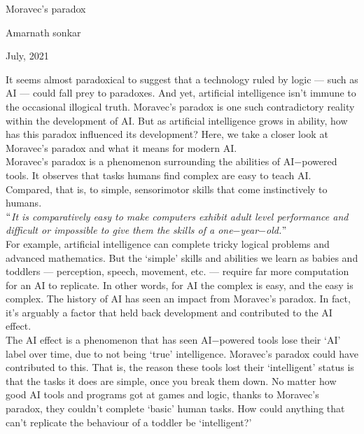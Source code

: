 \documentclass[12pt]{article}
\begin{document}
\begin{center}
{\LARGE Moravec's paradox}
\end{center}


\begin{center}
{\large Amarnath sonkar}
\end{center}


\begin{center}
{\large July, 2021}
\end{center}


\vspace{1\baselineskip}
It seems almost paradoxical to suggest that a technology ruled by logic — such as AI — could fall prey to paradoxes. And yet, artificial intelligence isn’t immune to the occasional illogical truth. Moravec’s paradox is one such contradictory reality within the development of AI. But as artificial intelligence grows in ability, how has this paradox influenced its development? Here, we take a closer look at Moravec’s paradox and what it means for modern AI.
\\

Moravec’s paradox is a phenomenon surrounding the abilities of AI$-$powered tools. It observes that tasks humans find complex are easy to teach AI. Compared, that is, to simple, sensorimotor skills that come instinctively to humans.
\\

\textit{$``$It is comparatively easy to make computers exhibit adult level performance and difficult or impossible to give them the skills of a one$-$year$-$old.$"$}
\\

For example, artificial intelligence can complete tricky logical problems and advanced mathematics. But the ‘simple’ skills and abilities we learn as babies and toddlers — perception, speech, movement, etc. — require far more computation for an AI to replicate. In other words, for AI the complex is easy, and the easy is complex. The history of AI has seen an impact from Moravec’s paradox. In fact, it’s arguably a factor that held back development and contributed to the AI effect.
\\

The AI effect is a phenomenon that has seen AI$-$powered tools lose their ‘AI’ label over time, due to not being ‘true’ intelligence. Moravec’s paradox could have contributed to this. That is, the reason these tools lost their ‘intelligent’ status is that the tasks it does are simple, once you break them down.  No matter how good AI tools and programs got at games and logic, thanks to Moravec’s paradox, they couldn’t complete ‘basic’ human tasks. How could anything that can’t replicate the behaviour of a toddler be ‘intelligent?’
\\
\end{document}
